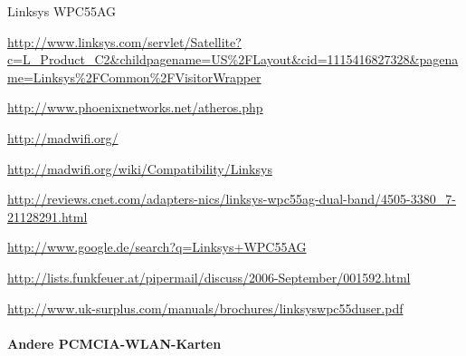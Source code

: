 \begin{wlandevice}{Linksys WPC55AG}
\begin{wlanlink}
\item \url{http://www.linksys.com/servlet/Satellite?c=L_Product_C2&childpagename=US\%2FLayout&cid=1115416827328&pagename=Linksys\%2FCommon\%2FVisitorWrapper}
\item \url{http://www.phoenixnetworks.net/atheros.php}
\item \url{http://madwifi.org/}
\item \url{http://madwifi.org/wiki/Compatibility/Linksys}
\item \url{http://reviews.cnet.com/adapters-nics/linksys-wpc55ag-dual-band/4505-3380_7-21128291.html}
\item \url{http://www.google.de/search?q=Linksys+WPC55AG}
\item \url{http://lists.funkfeuer.at/pipermail/discuss/2006-September/001592.html}
\item \url{http://www.uk-surplus.com/manuals/brochures/linksyswpc55duser.pdf}
\end{wlanlink}

\end{wlandevice}

\paragraph{Andere PCMCIA-WLAN-Karten}

